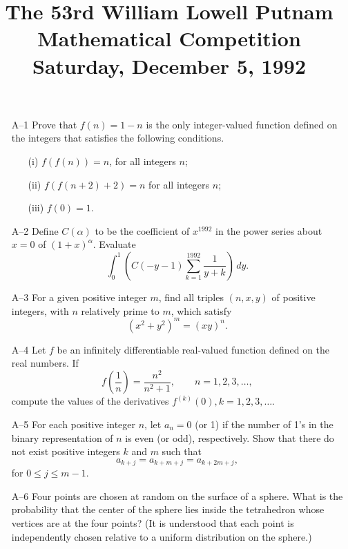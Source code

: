\documentclass[amssymb,twocolumn,pra,10pt,aps]{revtex4-1}
\begin{document}
\title{The 53rd William Lowell Putnam Mathematical Competition \\
    Saturday, December 5, 1992}
\maketitle

\newcommand{\MM}{{\mathcal{M}}}

\begin{itemize}
\item[A--1] Prove that $f(n) = 1-n$ is the only integer-valued function
defined on the integers that satisfies the following conditions.
\begin{itemize}
\item[(i)] $f(f(n)) = n$, for all integers $n$;
\item[(ii)] $f(f(n+2)+2) = n$ for all integers $n$;
\item[(iii)] $f(0) = 1$.
\end{itemize}

\item[A--2] Define $C(\alpha)$ to be the coefficient of $x^{1992}$ in the
power series about $x=0$ of $(1 + x)^\alpha$. Evaluate
\[
\int_0^1 \left( C(-y-1) \sum_{k=1}^{1992} \frac{1}{y+k} \right)\,dy.
\]

\item[A--3] For a given positive integer $m$, find all triples $(n, x, y)$
of positive integers, with $n$ relatively prime to $m$, which satisfy
\[
(x^2 + y^2)^m = (xy)^n.
\]

\item[A--4] Let $f$ be an infinitely differentiable real-valued function
defined on the real numbers. If
\[
f\left( \frac{1}{n} \right) = \frac{n^2}{n^2 + 1}, \qquad n = 1, 2, 3, \dots,
\]
compute the values of the derivatives $f^{(k)}(0), k = 1, 2, 3, \dots$.

\item[A--5] For each positive integer $n$, let $a_n = 0$ (or 1) if the
number of 1's in the binary representation of $n$ is even (or odd),
respectively. Show that there do not exist positive integers $k$ and $m$
such that
\[
a_{k+j} = a_{k+m+j} = a_{k+2m+j},
\]
for $0 \leq j \leq m-1$.

\item[A--6] Four points are chosen at random on the surface of a sphere.
What is the probability that the center of the sphere lies inside the
tetrahedron whose vertices are at the four points? (It is understood that
each point is independently chosen relative to a uniform distribution on
the sphere.)


\end{itemize}
\end{document}

